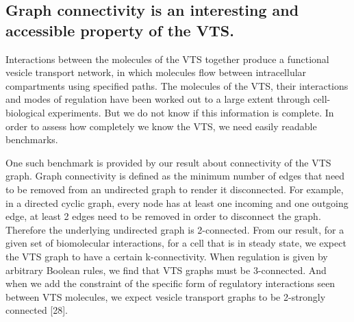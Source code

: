 

%
%
\subsection{Graph connectivity is an interesting and accessible property of the VTS.} 
Interactions between the molecules of the VTS together produce a functional vesicle transport network, in which molecules flow between intracellular compartments using specified paths.
%
The molecules of the VTS, their interactions and modes of regulation have been worked out to a large extent through cell-biological experiments. 
%
But we do not know if this information is complete. In order to assess how completely we know the VTS, we need easily readable benchmarks. 

One such benchmark is provided by our result about connectivity of the VTS graph. Graph connectivity is defined as the minimum number of edges that need to be removed from an undirected graph to render it disconnected. For example, in a directed cyclic graph, every node has at least one incoming and one outgoing edge, at least 2 edges need to be removed in order to disconnect the graph. Therefore the underlying undirected graph is 2-connected. 
From our result, for a given set of biomolecular interactions, for a cell that is in steady state, we expect the VTS graph to have a certain k-connectivity. When regulation is given by arbitrary Boolean rules,   we find that VTS graphs must be 3-connected. And when we add the constraint of the specific form of regulatory interactions seen between VTS molecules, we expect vesicle transport graphs to be 2-strongly connected [28].

